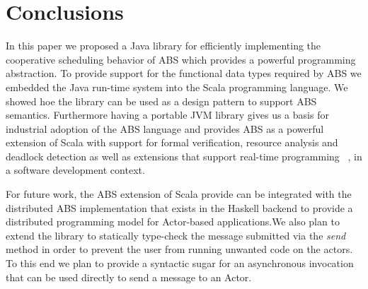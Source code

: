 \section{Conclusions}
\label{conc}
In this paper we proposed a Java library for efficiently implementing the cooperative scheduling behavior of ABS which provides a powerful programming abstraction. 
To provide support for the functional data types required by ABS we embedded the Java run-time system into the Scala programming language. We showed hoe the library can be used as a design pattern to support ABS semantics. Furthermore having a portable JVM library gives us a basis for industrial adoption of the ABS language and provides ABS as a powerful extension of Scala with support for formal verification, resource analysis and deadlock detection as well as extensions that support real-time programming ~\cite{rabs}, in a software development context.


\par For future work, the ABS extension of Scala provide can be integrated with the distributed ABS implementation that exists in the Haskell backend \cite{cloud} to provide a distributed programming model for Actor-based applications.We also plan to extend the library to statically type-check the message submitted via the \textit{send} method in order to prevent the user from running unwanted code on the actors. To this end we plan to provide a syntactic sugar for an asynchronous invocation that can be used directly to send a message to an Actor.







